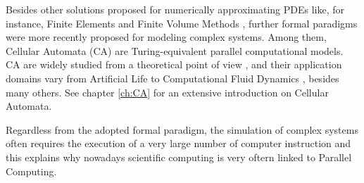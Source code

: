   
  
Besides other solutions proposed for numerically approximating PDEs
  like, for instance, Finite Elements \cite{Hutton} and Finite Volume Methods \cite{Moukalled}, further formal paradigms were more recently proposed for modeling complex systems. Among them, Cellular Automata (CA) \cite{vonNeumann:1966:TSA:1102024} are Turing-equivalent \cite{Codd:1968:CA:1098682, Cook04a} parallel computational models. CA are widely studied from a theoretical point
  of view \cite{Wolfram-1984, Langton-1990b, Wolfram-2002,
    Ninagawa201542}, and their application domains vary from
  Artificial Life \cite{Langton-1986, Beer2004309} to Computational
  Fluid Dynamics \cite{Frish&al-1986, McNamara&Zanetti-1988,
    Higuera&Jimenez-1989, Aidun2010439}, besides many others. See chapter \ref{ch:CA} for an extensive introduction on Cellular Automata.
    
Regardless from the adopted formal paradigm, the simulation of
complex systems often requires the execution of a very large number of computer instruction and this explains why nowadays scientific computing is very oftern linked to  Parallel Computing. 

